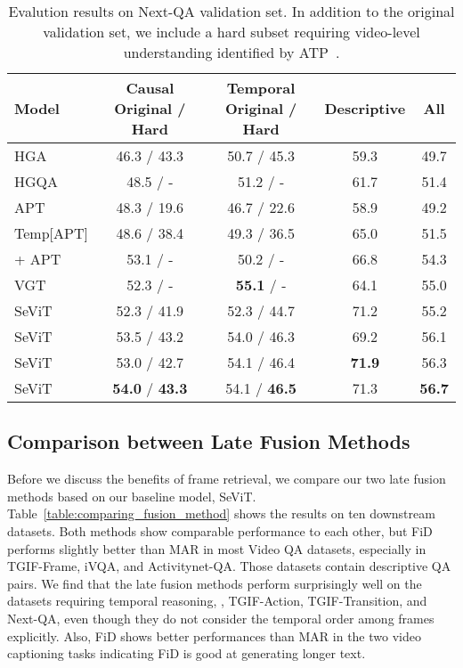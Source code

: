 \documentclass{article}
\newcommand{\frameworkname}{SeViT}
\begin{document}
\begin{table}[t!]
    \label{table:long-subsplit}
\end{table} \begin{table}[t!]
    \centering
    \small
    \caption{Evalution results on Next-QA validation set. In addition to the original validation set, we include a hard subset requiring video-level understanding identified by ATP~\cite{buch2022revisiting}.}
    \vskip 0.15in
\vskip 0.15in
   \begin{adjustbox}{width=0.48\textwidth} 
    \begin{tabular}{lcccc}
        \toprule
        Model & \makecell{Causal \\ \scriptsize{Original / Hard}} & \makecell{Temporal  \\ \scriptsize{Original / Hard}} & Descriptive & All \\
        \midrule
        HGA & 46.3 / 43.3 & 50.7 / 45.3 & 59.3 & 49.7 \\
        HGQA & 48.5 / - & 51.2 / - & 61.7 & 51.4 \\
        APT & 48.3 / 19.6 & 46.7 / 22.6 & 58.9 & 49.2 \\
        Temp[APT] & 48.6 / 38.4 & 49.3 / 36.5 & 65.0 & 51.5 \\
        \quad + APT & 53.1 / - & 50.2 / - & 66.8 & 54.3 \\
        VGT & 52.3 / - & \textbf{55.1} / - & 64.1 & 55.0 \\
        \midrule
        \frameworkname{} & 52.3 / 41.9 & 52.3 / 44.7 & 71.2 & 55.2 \\
        \frameworkname{} & 53.5 / 43.2 & 54.0 / 46.3 & 69.2 & 56.1 \\
        \frameworkname{} & 53.0 / 42.7 & 54.1 / 46.4 & \textbf{71.9} & 56.3 \\
        \frameworkname{} & \textbf{54.0} / \textbf{43.3} & 54.1 / \textbf{46.5} & 71.3 & \textbf{56.7} \\
        \bottomrule
    \end{tabular}
    \end{adjustbox}
\label{table:nextqa}
\end{table} 

\subsection{Comparison between Late Fusion Methods}



Before we discuss the benefits of frame retrieval, we compare our two late fusion methods based on our baseline model, \frameworkname{}. Table~\ref{table:comparing_fusion_method} shows the results on ten downstream datasets. Both methods show comparable performance to each other, but FiD performs slightly better than MAR in most Video QA datasets, especially in TGIF-Frame, iVQA, and Activitynet-QA. Those datasets contain descriptive QA pairs. We find that the late fusion methods perform surprisingly well on the datasets requiring temporal reasoning, \eg, TGIF-Action, TGIF-Transition, and Next-QA, even though they do not consider the temporal order among frames explicitly. Also, FiD shows better performances than MAR in the two video captioning tasks indicating FiD is good at generating longer text.
\end{document}
